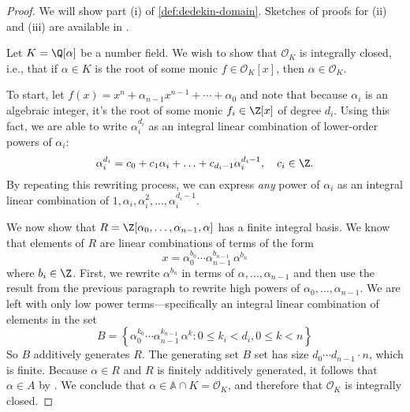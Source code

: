 \begin{proof}
    We will show part (i) of \autoref{def:dedekin-domain}. Sketches of proofs for (ii) and (iii) are available in \cite[40]{marcus}.

    Let $K = \Q[\alpha]$ be a number field. We wish to show that $\mathcal O_K$ is integrally closed, i.e., that if $\alpha \in K$ is the root of some monic $f \in \mathcal O_K[x]$, then $\alpha \in \mathcal O_K$.

    To start, let $f(x) = x^n + \alpha_{n-1}x^{n-1} + \cdots + \alpha_0$ and note that because $\alpha_i$ is an algebraic integer, it's the root of some monic $f_i \in \Z[x]$ of degree $d_i$. Using this fact, we are able to write $\alpha_i^{d_i}$ as an integral linear combination of lower-order powers of $\alpha_i$:
    \begin{equation}
        \alpha_i^{d_i} = c_0 + c_1 \alpha_i + \ldots + c_{d_i-1} \alpha_i^{d_i-1},
        \quad c_i \in \Z.
    \end{equation}
    By repeating this rewriting process, we can express \emph{any} power of $\alpha_i$ as an integral linear combination of $1, \alpha_i, \alpha_i^2, \ldots, \alpha_i^{d_i - 1}$.

    We now show that $R = \Z[\alpha_0, \ldots, \alpha_{n-1}, \alpha]$ has a finite integral basis. We know that elements of $R$ are linear combinations of terms of the form
    \begin{equation}
        x = \alpha_0^{b_0} \cdots \alpha_{n-1}^{b_{n-1}} \, \alpha^{b_n}
    \end{equation}
    where $b_i \in \Z$.
    First, we rewrite $\alpha^{b_n}$ in terms of $\alpha, \ldots, \alpha_{n-1}$ and then use the result from the previous paragraph to rewrite high powers of $\alpha_0, \ldots, \alpha_{n-1}$.
    We are left with only low power terms---specifically an integral linear combination of elements in the set
    \begin{equation}
        B = \left\{
        \alpha_0^{k_0} \cdots \alpha_{n-1}^{k_{n-1}} \, \alpha^k
        : 0 \leq k_i < d_i, 0 \leq k < n
        \right\}
    \end{equation}
    So $B$ additively generates $R$. The generating set $B$ set has size $d_0 \cdots d_{n-1} \cdot n$, which is finite. Because $\alpha \in R$ and $R$ is finitely additively generated, it follows that $\alpha \in A$ by \cite[Theorem 2.2]{marcus}. We conclude that $\alpha \in \mathbb A \cap K = \mathcal O_K$, and therefore that $\mathcal O_K$ is integrally closed.
\end{proof}


